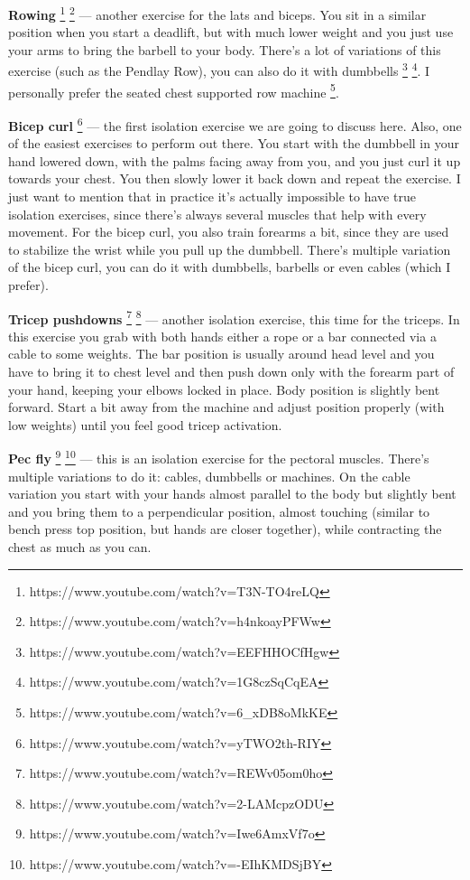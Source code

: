 \documentclass[openany, 12pt]{book}
\begin{document}
        \textbf{Rowing}
        \footnote{https://www.youtube.com/watch?v=T3N-TO4reLQ}
        \footnote{https://www.youtube.com/watch?v=h4nkoayPFWw}
        --- another exercise for the lats and biceps. You sit in a similar position when you start a deadlift, but with much lower weight and you just use your arms to bring the barbell to your body.
        There's a lot of variations of this exercise (such as the Pendlay Row), you can also do it with dumbbells
        \footnote{https://www.youtube.com/watch?v=EEFHHOCfHgw}
        \footnote{https://www.youtube.com/watch?v=1G8czSqCqEA}. I personally prefer the seated chest supported row machine
        \footnote{https://www.youtube.com/watch?v=6\_xDB8oMkKE}.

        \textbf{Bicep curl}
        \footnote{https://www.youtube.com/watch?v=yTWO2th-RIY}
        --- the first isolation exercise we are going to discuss here. Also, one of the easiest exercises to perform out there. You start with the dumbbell in your hand lowered down, with the palms
        facing away from you, and you just curl it up towards your chest. You then slowly lower it back down and repeat the exercise.
        I just want to mention that in practice it's actually impossible to have true isolation exercises, since there's always several muscles that help
        with every movement. For the bicep curl, you also train forearms a bit, since they are used to stabilize the wrist while you pull up the dumbbell.
        There's multiple variation of the bicep curl, you can do it with dumbbells, barbells or even cables (which I prefer).

        \textbf{Tricep pushdowns}
        \footnote{https://www.youtube.com/watch?v=REWv05om0ho}
        \footnote{https://www.youtube.com/watch?v=2-LAMcpzODU}
        --- another isolation exercise, this time for the triceps. In this exercise you grab with both hands either a rope or a bar connected via a cable to some weights.
        The bar position is usually around head level and you have to bring it to chest level and then push down only with the
        forearm part of your hand, keeping your elbows locked in place. Body position is slightly bent forward. Start a bit away from the machine and adjust position properly (with low weights)
        until you feel good tricep activation.

        \textbf{Pec fly}
        \footnote{https://www.youtube.com/watch?v=Iwe6AmxVf7o}
        \footnote{https://www.youtube.com/watch?v=-EIhKMDSjBY}
        --- this is an isolation exercise for the pectoral muscles. There's multiple variations to do it: cables, dumbbells or machines.
        On the cable variation you start with your hands almost parallel to the body but slightly bent and you bring them to a perpendicular position, almost touching (similar to bench press top
        position, but hands are closer together), while contracting the chest as much as you can.
\end{document}
